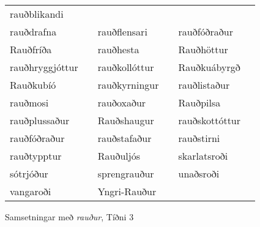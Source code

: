 \documentclass[../samsetningasafn.tex]{subfiles}
\begin{document}
\begin{wordlist}[H]
\begin{tcolorbox}
\begin{tabular}{BlBlBl}
		rauðblikandi		&		\\ 
		rauðdrafna		&		& 	
		rauðflensari		&		& 	
		rauðfóðraður		&		\\ 
		Rauðfríða		&		& 	
		rauðhesta		&		& 	
		Rauðhöttur		&		\\ 	
		rauðhryggjóttur	&		& 	
		rauðkollóttur		&		& 
		Rauðkuábyrgð	&		\\ 
		Rauðkubíó		&		& 	
		rauðkyrningur	&		& 
		rauðlistaður		&		\\ 
		rauðmosi		&		& 
		rauðoxaður		&		& 	
		Rauðpilsa		&		\\ 
		rauðplussaður	&		& 
		Rauðshaugur		&		& 
		rauðskottóttur	&		\\ 
		rauðfóðraður		&		& 
		rauðstafaður		&		& 
		rauðstirni		&		\\ 
		rauðtypptur		& 		& 	
		Rauðuljós		&		& 
		skarlatsroði		&		\\ 	
		sótrjóður		&		& 
		sprengrauður		&		& 
		unaðsroði		&		\\ 
		vangaroði		&		& 
		Yngri-Rauður		&		& 
						&
	\end{tabular}

\end{tcolorbox}
	\caption{Samsetningar með \textit{rauður}, Tíðni 3}
	\label{listi:rautt.3}
\end{wordlist}
\end{document}
